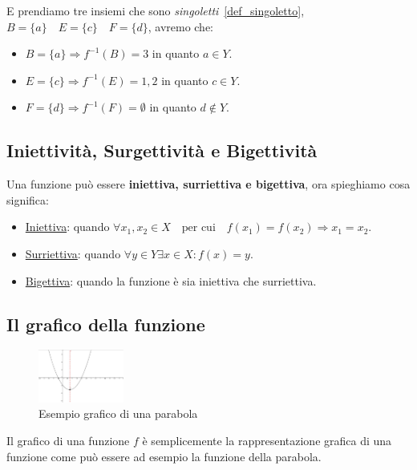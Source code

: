 \documentclass{article}
\theoremstyle{definition}
\begin{document}
E prendiamo tre insiemi che sono \textit{singoletti}~\ref{def_singoletto}, $ B = \{a\} \quad E = \{c\} \quad F = \{d\}$, avremo che:
\begin{itemize}
        \item $ B = \{a\} \Rightarrow {f}^{-1}(B) = {3} $ in quanto $ a \in Y $. 
        \item $ E = \{c\} \Rightarrow {f}^{-1}(E) = {1,2}$ in quanto $ c \in Y $.  
        \item $ F = \{d\} \Rightarrow {f}^{-1}(F) = {\emptyset} $ in quanto $ d \not \in Y $.
\end{itemize}



\subsection{Iniettività, Surgettività e Bigettività}\label{sec:iniettiva_surriettiva_bigettiva}
Una funzione può essere \textbf{iniettiva, surriettiva e bigettiva}, ora spieghiamo cosa significa:
\begin{itemize}
        \item \underline{Iniettiva}: quando $ \forall x_1,x_2 \in X \quad \mbox{per cui} \quad f(x_1)=f(x_2) \Rightarrow x_1=x_2  $.   
        \item \underline{Surriettiva}: quando $ \forall y \in Y  \exists x \in X : f(x) = y $.   
        \item \underline{Bigettiva}: quando la funzione è sia iniettiva che surriettiva.  
\end{itemize}



\subsection{Il grafico della funzione}
\begin{figure}[!h]
\centering
        \includegraphics[width=0.25\textwidth]{esempio_grafico_funzione.jpg}
        \caption{Esempio grafico di una parabola}\label{fig:esempio_grafico_funzione}
\end{figure}
Il grafico di una funzione $f$ è semplicemente la rappresentazione grafica di una funzione come può essere ad esempio la funzione della parabola.
\end{document}
